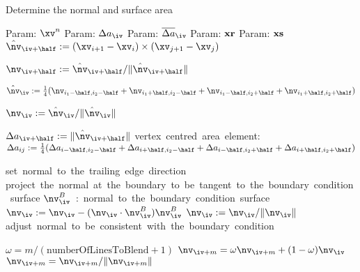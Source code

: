 \begin{algorithm}
\caption{Determine the normal and surface area}
\begin{algorithmic}[1]
  \State Param: $\xv^n$ 
  \State Param: $\da_\iv$ 
  \State Param: $\das_\iv$ 
  \State Param: ${\bf xr}$ 
  \State Param: ${\bf xs}$ 
  \State 
  \State $\hat{\nv}_{\iv+\half} := (\xv_{i+1}-\xv_i)\times (\xv_{j+1}-\xv_j)$  

  \State $\nv_{\iv+\half} := \hat{\nv}_{\iv+\half} / \| \hat{\nv}_{\iv+\half} \|$   

  \State $\hat{\nv}_\iv := {1\over4}( \nv_{i_1-\half,i_2-\half}+\nv_{i_1+\half,i_2-\half}+\nv_{i_1-\half,i_2+\half}+\nv_{i_1+\half,i_2+\half} ) $

  \State $\nv_\iv := \hat{\nv}_\iv/\| \hat{\nv}_\iv \|$   

  \State $\Delta a_{\iv+\half} := \| \hat{\nv}_{\iv+\half} \|$     
  \State \mbox{vertex centred area element:}
  \State $\Delta a_{ij} := {1\over4}( \Delta a_{i-\half,i_2-\half}+\Delta a_{i+\half,i_2-\half}+\Delta a_{i-\half,i_2+\half}+\Delta a_{i+\half,i_2+\half} )$

  \State 
  \State {}
     \State \mbox{set normal to the trailing edge direction}
     \State \mbox{project the normal at the boundary to be tangent to the boundary condition surface}
     \State \mbox{$\nv^B_\iv$ : normal to the boundary condition surface}
     \State $\nv_\iv := \nv_\iv - (\nv_\iv \cdot \nv^B_\iv ) \nv^B_\iv$ 
     \State $\nv_\iv := \nv_\iv / \| \nv_\iv \|$
     \State \mbox{adjust normal to be consistent with the boundary condition}
  \EndIf

  \State
  \State {}
    \State $\omega = m/(\mbox{numberOfLinesToBlend}+1)$
    \State $\nv_{\iv+m} = \omega \nv_{\iv+m} + (1-\omega) \nv_\iv$
    \State $\nv_{\iv+m} = \nv_{\iv+m} / \| \nv_{\iv+m} \|$
  \EndFor


\end{algorithmic}
\end{algorithm}
